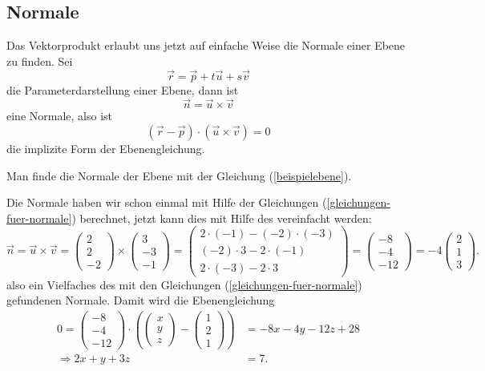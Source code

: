 \subsection{Normale}
Das Vektorprodukt erlaubt uns jetzt auf einfache Weise die Normale einer
Ebene zu finden. Sei 
\[
\vec r=\vec p+t\vec u+s\vec v
\]
die Parameterdarstellung einer Ebene, dann ist
\[
\vec n=\vec u\times\vec v
\]
eine Normale, also ist
\[
(\vec r-\vec p)\cdot (\vec u\times\vec v)=0
\]
die implizite Form der Ebenengleichung.

\begin{beispiel}
Man finde die Normale der Ebene mit der Gleichung (\ref{beispielebene}).

\smallskip
{\parindent 0pt Die Normale haben wir schon einmal mit Hilfe der Gleichungen
(\ref{gleichungen-fuer-normale}) berechnet, jetzt kann dies
mit Hilfe des vereinfacht werden:}
\begin{equation}
\vec n = \vec u\times \vec v=
\begin{pmatrix}2\\2\\-2\end{pmatrix}
\times
\begin{pmatrix}3\\-3\\-1\end{pmatrix}
=
\begin{pmatrix}
2\cdot(-1)-(-2)\cdot(-3)\\
(-2)\cdot 3-2\cdot (-1)\\
2\cdot(-3)-2\cdot 3
\end{pmatrix}
=
\begin{pmatrix}
-8\\
-4\\
-12
\end{pmatrix}
=-4\begin{pmatrix}2\\1\\3\end{pmatrix}.
\label{beispielvektorprodukt}
\end{equation}
also ein Vielfaches des mit den Gleichungen (\ref{gleichungen-fuer-normale})
gefundenen Normale. Damit wird die Ebenengleichung
\begin{align*}
0=
\begin{pmatrix} -8\\ -4\\ -12 \end{pmatrix}\cdot
\left(
\begin{pmatrix}x\\y\\z\end{pmatrix}
-
\begin{pmatrix}1\\2\\1 \end{pmatrix}
\right)
&=
-8x-4y-12z+
28
\\
\Rightarrow
2x+y+3z&=7.
\end{align*}
\end{beispiel}

